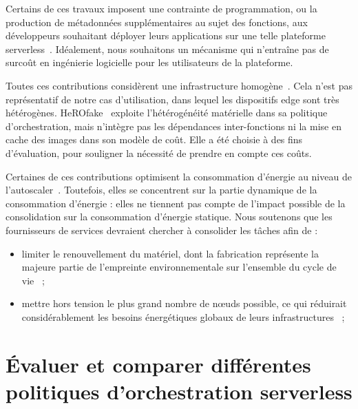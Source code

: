 Certains de ces travaux imposent une contrainte de programmation, ou la production de métadonnées supplémentaires au sujet des fonctions, aux développeurs souhaitant déployer leurs applications sur une telle plateforme serverless~\cite{zijunFassflowEfficient2022, abdiPaletteLoadBalancing2023}. Idéalement, nous souhaitons un mécanisme qui n'entraîne pas de surcoût en ingénierie logicielle pour les utilisateurs de la plateforme.

Toutes ces contributions considèrent une infrastructure homogène~\cite{bhasiCypressInputSizesensitive2022, zijunFassflowEfficient2022, smithFaDOFaaSFunctions2022, zhangFIRSTExploitingMultiDimensional2023, abdiPaletteLoadBalancing2023}. Cela n'est pas représentatif de notre cas d'utilisation, dans lequel les dispositifs edge sont très hétérogènes. HeROfake~\cite{herofake} exploite l'hétérogénéité matérielle dans sa politique d'orchestration, mais n'intègre pas les dépendances inter-fonctions ni la mise en cache des images dans son modèle de coût. Elle a été choisie à des fins d'évaluation, pour souligner la nécessité de prendre en compte ces coûts.

Certaines de ces contributions optimisent la consommation d'énergie au niveau de l'autoscaler~\cite{bhasiCypressInputSizesensitive2022, zhangFIRSTExploitingMultiDimensional2023}. Toutefois, elles se concentrent sur la partie dynamique de la consommation d'énergie : elles ne tiennent pas compte de l'impact possible de la consolidation sur la consommation d'énergie statique. Nous soutenons que les fournisseurs de services devraient chercher à consolider les tâches afin de :

\begin{itemize}
    \item limiter le renouvellement du matériel, dont la fabrication représente la majeure partie de l'empreinte environnementale sur l'ensemble du cycle de vie~\cite{bordage2019empreinte, NumeriqueQuelsImpacts} ;
    \item mettre hors tension le plus grand nombre de nœuds possible, ce qui réduirait considérablement les besoins énergétiques globaux de leurs infrastructures~\cite{leeEnergyEfficientUtilization2012} ;
\end{itemize}

\section{Évaluer et comparer différentes politiques d'orchestration serverless}
\label{section:sota-herosim}

